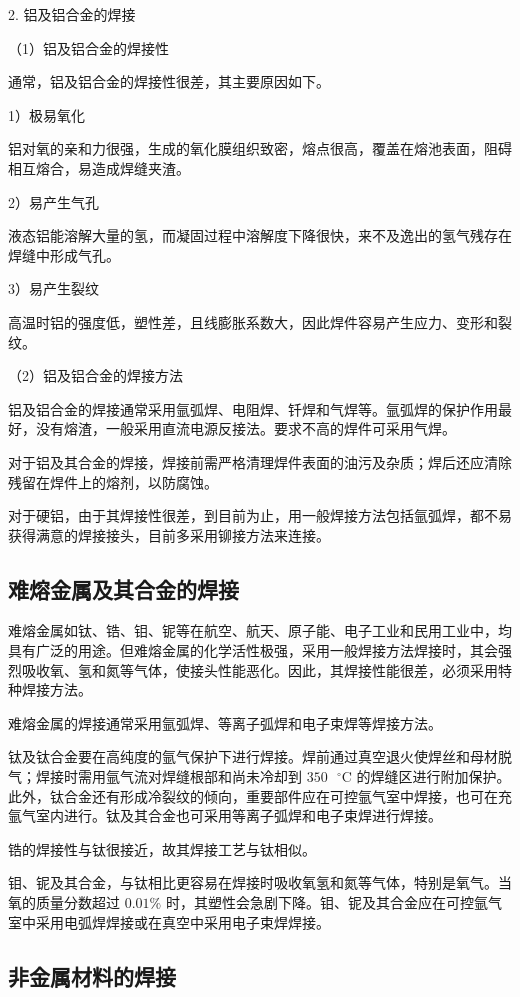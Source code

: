 \documentclass[UTF8]{ctexbook}
\newcommand{\◎}{\ensuremath{\bigcirc}}
\begin{document}
2. 铝及铝合金的焊接

（1）铝及铝合金的焊接性

通常，铝及铝合金的焊接性很差，其主要原因如下。

1）极易氧化

铝对氧的亲和力很强，生成的氧化膜组织致密，熔点很高，覆盖在熔池表面，阻碍相互熔合，易造成焊缝夹渣。

2）易产生气孔

液态铝能溶解大量的氢，而凝固过程中溶解度下降很快，来不及逸出的氢气残存在焊缝中形成气孔。

3）易产生裂纹

高温时铝的强度低，塑性差，且线膨胀系数大，因此焊件容易产生应力、变形和裂纹。

（2）铝及铝合金的焊接方法

铝及铝合金的焊接通常采用氩弧焊、电阻焊、钎焊和气焊等。氩弧焊的保护作用最好，没有熔渣，一般采用直流电源反接法。要求不高的焊件可采用气焊。

对于铝及其合金的焊接，焊接前需严格清理焊件表面的油污及杂质；焊后还应清除残留在焊件上的熔剂，以防腐蚀。

对于硬铝，由于其焊接性很差，到目前为止，用一般焊接方法包括氩弧焊，都不易获得满意的焊接接头，目前多采用铆接方法来连接。

\subsection{难熔金属及其合金的焊接}

难熔金属如钛、锆、钼、铌等在航空、航天、原子能、电子工业和民用工业中，均具有广泛的用途。但难熔金属的化学活性极强，采用一般焊接方法焊接时，其会强烈吸收氧、氢和氮等气体，使接头性能恶化。因此，其焊接性能很差，必须采用特种焊接方法。

难熔金属的焊接通常采用氩弧焊、等离子弧焊和电子束焊等焊接方法。

钛及钛合金要在高纯度的氩气保护下进行焊接。焊前通过真空退火使焊丝和母材脱气；焊接时需用氩气流对焊缝根部和尚未冷却到 $350\text{ }^\circ\text{C}$ 的焊缝区进行附加保护。此外，钛合金还有形成冷裂纹的倾向，重要部件应在可控氩气室中焊接，也可在充氩气室内进行。钛及其合金也可采用等离子弧焊和电子束焊进行焊接。

锆的焊接性与钛很接近，故其焊接工艺与钛相似。

钼、铌及其合金，与钛相比更容易在焊接时吸收氧氢和氮等气体，特别是氧气。当氧的质量分数超过 $0.01\%$ 时，其塑性会急剧下降。钼、铌及其合金应在可控氩气室中采用电弧焊焊接或在真空中采用电子束焊焊接。

\subsection{非金属材料的焊接}
\end{document}
